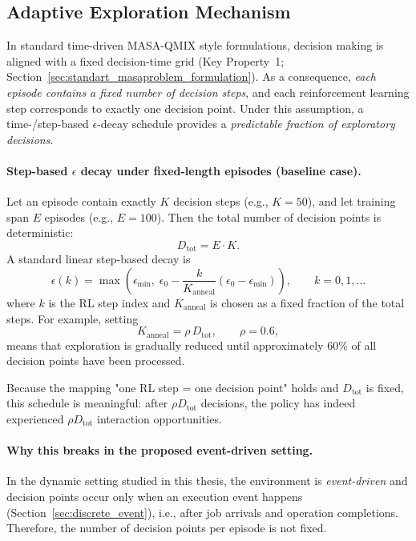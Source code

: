 \subsection{Adaptive Exploration Mechanism}
\label{sec:adaptive_epsilon_decay}

In standard time-driven MASA-QMIX style formulations, decision making is aligned
with a fixed decision-time grid (Key Property~1; Section~\ref{sec:standart_masaproblem_formulation}).
As a consequence, \emph{each episode contains a fixed number of decision steps},
and each reinforcement learning step corresponds to exactly one decision point.
Under this assumption, a time-/step-based $\epsilon$-decay schedule provides a
\emph{predictable fraction of exploratory decisions}.

\paragraph{Step-based $\epsilon$ decay under fixed-length episodes (baseline case).}
Let an episode contain exactly $K$ decision steps (e.g., $K=50$), and let training
span $E$ episodes (e.g., $E=100$). Then the total number of decision points is
deterministic:
\begin{equation}
D_{\text{tot}} = E \cdot K.
\label{eq:baseline_total_decisions}
\end{equation}
A standard linear step-based decay is
\begin{equation}
\epsilon(k)
=
\max\!\left(
\epsilon_{\min},
\;
\epsilon_0 - \frac{k}{K_{\mathrm{anneal}}}
(\epsilon_0 - \epsilon_{\min})
\right),
\qquad k=0,1,\dots
\label{eq:step_based_epsilon}
\end{equation}
where $k$ is the RL step index and $K_{\mathrm{anneal}}$ is chosen as a fixed
fraction of the total steps. For example, setting
\begin{equation}
K_{\mathrm{anneal}} = \rho \, D_{\text{tot}}, \qquad \rho=0.6,
\label{eq:anneal_fraction_baseline}
\end{equation}
means that exploration is gradually reduced until approximately $60\%$ of all
decision points have been processed.

Because the mapping "one RL step = one decision point" holds and $D_{\text{tot}}$
is fixed, this schedule is meaningful: after $\rho D_{\text{tot}}$ decisions,
the policy has indeed experienced $\rho D_{\text{tot}}$ interaction opportunities.

\paragraph{Why this breaks in the proposed event-driven setting.}
In the dynamic setting studied in this thesis, the environment is \emph{event-driven}
and decision points occur only when an execution event happens (Section~\ref{sec:discrete_event}),
i.e., after job arrivals and operation completions. Therefore, the number of
decision points per episode is not fixed.

